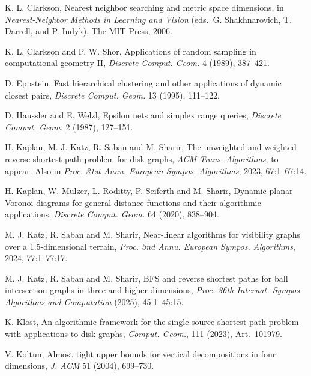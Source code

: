 \documentclass[11pt]{article}
\theoremstyle{definition}
\begin{document}
\begin{thebibliography}{}
	K. L. Clarkson,
	Nearest neighbor searching and metric space dimensions,
	in \emph{Nearest-Neighbor Methods in Learning and Vision}
	(eds.\ G. Shakhnarovich, T. Darrell, and P. Indyk), The MIT Press, 2006.

K. L. Clarkson and P. W. Shor,
Applications of random sampling in computational geometry II,
{\it Discrete Comput. Geom.} 4 (1989), 387--421.

D. Eppstein,
Fast hierarchical clustering and other applications of dynamic closest pairs, 
{\it Discrete Comput. Geom.} 13 (1995), 111--122.

%

D. Haussler and E. Welzl,
Epsilon nets and simplex range queries,
{\it Discrete Comput. Geom.} 2 (1987), 127--151.

H. Kaplan, M. J. Katz, R. Saban and M. Sharir,
The unweighted and weighted reverse shortest path problem for disk graphs,
{\it ACM Trans. Algorithms}, to appear.
Also in {\it Proc. 31st Annu. European Sympos. Algorithms}, 2023, 67:1--67:14.

H. Kaplan, W. Mulzer, L. Roditty, P. Seiferth and M. Sharir,
Dynamic planar Voronoi diagrams for general distance functions and their algorithmic applications,
{\it Discrete Comput. Geom.} 64 (2020), 838--904.

M. J. Katz, R. Saban and M. Sharir,
Near-linear algorithms for visibility graphs over a 1.5-dimensional terrain,
{\it Proc. 3nd Annu. European Sympos. Algorithms}, 2024, 77:1--77:17.

M. J. Katz, R. Saban and M. Sharir,
BFS and reverse shortest paths for ball intersection graphs in three and higher dimensions,
{\it Proc. 36th Internat. Sympos. Algorithms and Computation} (2025), 45:1--45:15.

K. Klost,
An algorithmic framework for the single source shortest path problem with applications to disk graphs,
{\it Comput. Geom.}, 111 (2023), Art.~101979.

V. Koltun,
Almost tight upper bounds for vertical decompositions in four dimensions,
{\it J. ACM} 51 (2004), 699--730.


\end{thebibliography}
\end{document}
